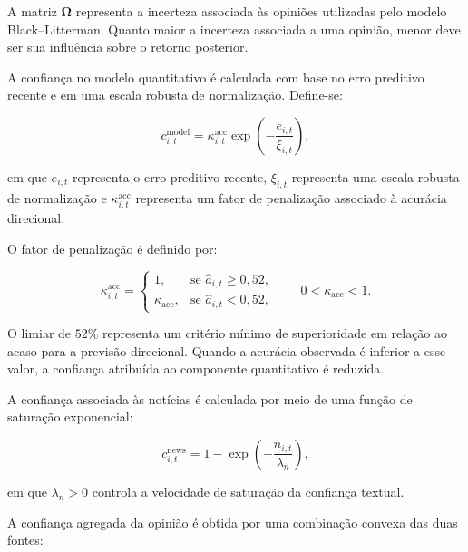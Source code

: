 A matriz $\boldsymbol{\Omega}$ representa a incerteza associada às opiniões utilizadas pelo modelo Black--Litterman. Quanto maior a incerteza associada a uma opinião, menor deve ser sua influência sobre o retorno posterior.

A confiança no modelo quantitativo é calculada com base no erro preditivo recente e em uma escala robusta de normalização. Define-se:

\begin{equation}
    c_{i,t}^{\mathrm{model}}
    =
    \kappa_{i,t}^{\mathrm{acc}}
    \exp
    \left(
        -\frac{e_{i,t}}{\xi_{i,t}}
    \right),
    \label{eq:confianca_modelo}
\end{equation}

\noindent em que $e_{i,t}$ representa o erro preditivo recente, $\xi_{i,t}$ representa uma escala robusta de normalização e $\kappa_{i,t}^{\mathrm{acc}}$ representa um fator de penalização associado à acurácia direcional.

O fator de penalização é definido por:

\begin{equation}
    \kappa_{i,t}^{\mathrm{acc}}
    =
    \begin{cases}
        1,
        & \text{se } \widehat{a}_{i,t}\geq 0{,}52,\\
        \kappa_{\mathrm{acc}},
        & \text{se } \widehat{a}_{i,t}<0{,}52,
    \end{cases}
    \qquad
    0<\kappa_{\mathrm{acc}}<1.
    \label{eq:penalizacao_acuracia}
\end{equation}

O limiar de $52\%$ representa um critério mínimo de superioridade em relação ao acaso para a previsão direcional. Quando a acurácia observada é inferior a esse valor, a confiança atribuída ao componente quantitativo é reduzida.

A confiança associada às notícias é calculada por meio de uma função de saturação exponencial:

\begin{equation}
    c_{i,t}^{\mathrm{news}}
    =
    1-
    \exp
    \left(
        -\frac{n_{i,t}}{\lambda_n}
    \right),
    \label{eq:confianca_noticias}
\end{equation}

\noindent em que $\lambda_n>0$ controla a velocidade de saturação da confiança textual.

A confiança agregada da opinião é obtida por uma combinação
convexa das duas fontes:

